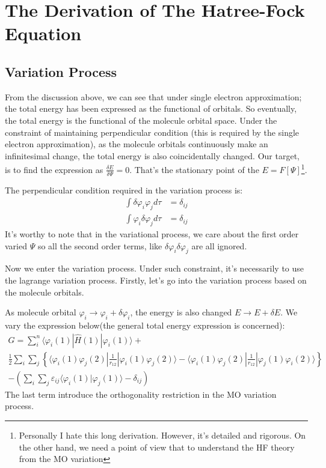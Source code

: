 \section{The Derivation of The Hatree-Fock Equation}
\subsection{Variation Process}\label{HFT:6}
%
%
%
From the discussion above, we can see that under single electron
approximation; the total energy has been expressed as the functional
of orbitals. So eventually, the total energy is the functional of
the molecule orbital space. Under the constraint of maintaining
perpendicular condition (this is required by the single electron
approximation), as the molecule orbitals continuously make an
infinitesimal change, the total energy is also coincidentally
changed. Our target, is to find the expression as $\frac{\delta
E}{\delta \Psi} = 0$. That's the stationary point of the
$E=F[\Psi]$\footnote{Personally I hate this long derivation. However, it's
detailed and rigorous. On the other hand, we need a point of view that to
understand the HF theory from the MO variation}.

The perpendicular condition required in the variation process is:
\begin{align}\label{}
    \int\delta\varphi_{i}\varphi_{j}d\tau &= \delta_{ij} \nonumber \\
    \int\varphi_{i}\delta\varphi_{j}d\tau &= \delta_{ij}
\end{align}
It's worthy to note that in the variational process, we care about the first
order varied $\Psi$ so all the second order terms, like
$\delta\varphi_{i}\delta\varphi_{j}$ are all ignored.

Now we enter the variation process. Under such constraint, it's
necessarily to use the lagrange variation process. Firstly, let's go
into the variation process based on the molecule orbitals.

As molecule orbital
$\varphi_{i}\rightarrow\varphi_{i}+\delta\varphi_{i}$, the energy is
also changed $E\rightarrow E+\delta E$. We vary the expression
below(the general total energy expression is concerned):
\begin{multline}\label{HFTeq:1}
  G =\sum_{i}^{n}\langle\varphi_{i}(1)|\hat{H}(1)|\varphi_{i}(1)\rangle
    +  \\
\frac{1}{2}\sum_{i}\sum_{j} \left\{
\langle\varphi_{i}(1)\varphi_{j}(2)|\frac{1}{r_{12}}|\varphi_{i}(1)\varphi_{j}(2)\rangle-
\langle\varphi_{i}(1)\varphi_{j}(2)|\frac{1}{r_{12}}|\varphi_{j}(1)\varphi_{i}(2)\rangle
\right\} \\
-(\sum_{i}\sum_{j}\varepsilon_{ij}\langle\varphi_{i}(1)|\varphi_{j}(1)\rangle
-\delta_{ij} )
\end{multline}
The last term introduce the orthogonality restriction in the MO variation
process.

